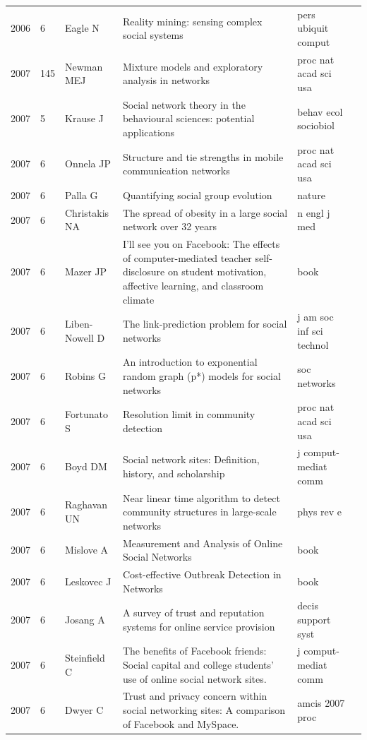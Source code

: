 \documentclass[11pt]{article} %
\begin{document}
\begin{landscape}
\begin{longtable}{p{0.7cm}|p{0.8cm}|p{3cm}|p{14.5cm}|p{3.5cm}l}
2006& 	6& 	 Eagle N& 	 Reality mining: sensing complex social systems& 	 pers ubiquit comput\\
2007& 	145& 	 Newman MEJ& 	 Mixture models and exploratory analysis in networks& 	 proc nat acad sci usa\\
2007& 	5& 	 Krause J& 	 Social network theory in the behavioural sciences: potential applications& 	 behav ecol sociobiol\\
2007& 	6& 	 Onnela JP& 	 Structure and tie strengths in mobile communication networks& 	 proc nat acad sci usa\\
2007& 	6& 	 Palla G& 	 Quantifying social group evolution& 	 nature\\
2007& 	6& 	 Christakis NA& 	 The spread of obesity in a large social network over 32 years& 	 n engl j med\\
2007& 	6& 	 Mazer JP& 	 I'll see you on Facebook: The effects of computer-mediated teacher self-disclosure on student motivation, affective learning, and classroom climate& 	 book\\
2007& 	6& 	 Liben-Nowell D& 	 The link-prediction problem for social networks& 	 j am soc inf sci technol\\
2007& 	6& 	 Robins G& 	 An introduction to exponential random graph (p*) models for social networks& 	 soc networks\\
2007& 	6& 	 Fortunato S& 	 Resolution limit in community detection& 	 proc nat acad sci usa\\
2007& 	6& 	 Boyd DM& 	 Social network sites: Definition, history, and scholarship& 	 j comput-mediat comm\\
2007& 	6& 	 Raghavan UN& 	 Near linear time algorithm to detect community structures in large-scale networks& 	 phys rev e\\
2007& 	6& 	 Mislove A& 	 Measurement and Analysis of Online Social Networks& 	 book\\
2007& 	6& 	 Leskovec J& 	 Cost-effective Outbreak Detection in Networks& 	 book\\
2007& 	6& 	 Josang A& 	 A survey of trust and reputation systems for online service provision& 	 decis support syst\\
2007& 	6& 	 Steinfield C& 	The benefits of Facebook friends: Social capital and college students’ use of online social network sites.& 	 j comput-mediat comm\\
2007& 	6& 	 Dwyer C& 	 Trust and privacy concern within social networking sites: A comparison of Facebook and MySpace.& 	 amcis 2007 proc\\

\end{longtable}
\end{landscape}
\end{document}
